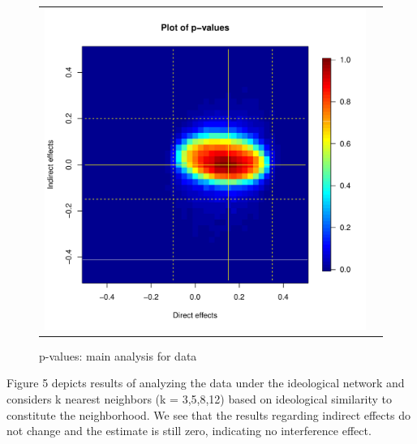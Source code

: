 \documentclass[12pt]{article}
\begin{document}
\begin{figure}
	\centering
	\begin{tabular}{cc}
	\includegraphics[scale=0.45]{./images/pval_plot_bergan_main.pdf}
	\end{tabular}
	\caption{p-values: main analysis for \citet{bergan2015call} data}
\end{figure}


Figure 5 depicts results of analyzing the \citet{bergan2015call} data under the ideological network and considers k nearest neighbors (k = 3,5,8,12) based on ideological similarity to constitute the neighborhood. We see that the results regarding indirect effects do not change and the estimate is still zero, indicating no interference effect.
\end{document}
